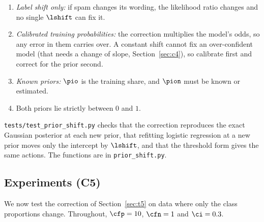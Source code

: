 \begin{assumptions}
\begin{enumerate}[label=(\roman*),itemsep=1pt,topsep=2pt]
  \item \emph{Label shift only:} if spam changes its wording, the likelihood ratio changes and no single
        $\lshift$ can fix it.
  \item \emph{Calibrated training probabilities:} the correction multiplies the model's odds, so any error
        in them carries over. A constant shift cannot fix an over-confident model (that needs a change of
        slope, Section~\ref{sec:c4}), so calibrate first and correct for the prior second.
  \item \emph{Known priors:} $\pio$ is the training share, and $\pion$ must be known or estimated.
  \item Both priors lie strictly between $0$ and $1$.
\end{enumerate}
\end{assumptions}
\texttt{tests/test\_prior\_shift.py} checks that the correction reproduces the exact Gaussian posterior at
each new prior, that refitting logistic regression at a new prior moves only the intercept by $\lshift$, and
that the threshold form gives the same actions. The functions are in \texttt{prior\_shift.py}.

\subsection{Experiments (C5)}
\label{sec:c5}

We now test the correction of Section~\ref{sec:t5} on data where only the class proportions change.
Throughout, $\cfp=10$, $\cfn=1$ and $\ci=0.3$.

